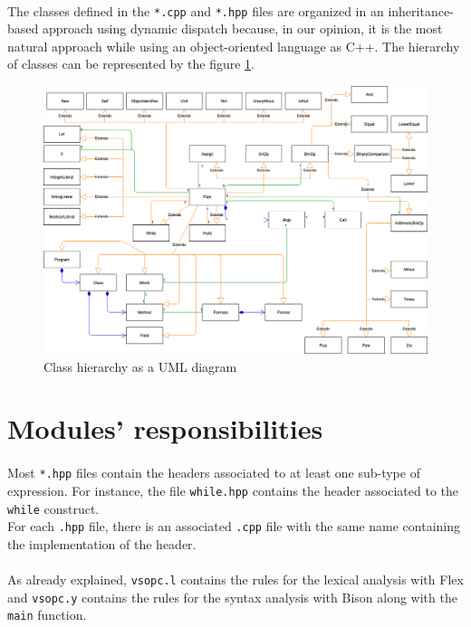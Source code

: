 \documentclass[a4paper, 11pt, oneside]{article}
\begin{document}
\paragraph{}The classes defined in the \texttt{*.cpp} and \texttt{*.hpp} files are organized in an inheritance-based approach using dynamic dispatch because, in our opinion, it is the most natural approach while using an object-oriented language as C++. The hierarchy of classes can be represented by the figure \ref{classHierarchy}.
\begin{figure}
\centering
\includegraphics[scale=0.35]{uml.png}
\caption{Class hierarchy as a UML diagram}
\label{classHierarchy}
\end{figure}


\section{Modules' responsibilities}
\paragraph{}Most \texttt{*.hpp} files contain the headers associated to at least one sub-type of expression. For instance, the file \texttt{while.hpp} contains the header associated to the \texttt{while} construct.\\
For each \texttt{.hpp} file, there is an associated \texttt{.cpp} file with the same name containing the implementation of the header.

\paragraph{}As already explained, \texttt{vsopc.l} contains the rules for the lexical analysis with Flex and \texttt{vsopc.y} contains the rules for the syntax analysis with Bison along with the \texttt{main} function.
\end{document}

